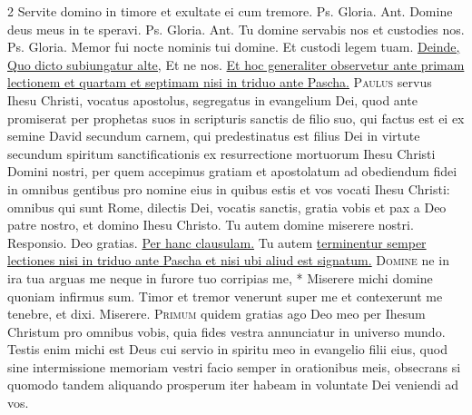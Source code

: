 \begin{multicols*}{2}
 Servite domino in timore et exultate ei cum tremore. {\color{Red} Ps.}     Gloria. {\color{Red} Ant.} Domine deus meus in te speravi. {\color{Red} Ps.}     Gloria. {\color{Red} Ant.} Tu domine servabis nos et custodies nos. {\color{Red} Ps.}     Gloria. \V Memor fui nocte nominis tui domine. \R Et custodi legem tuam. \ul{Deinde,}  \ul{Quo dicto subiungatur alte,} Et ne nos. \ul{Et hoc generaliter observetur ante primam lectionem et quartam et septimam nisi in triduo ante Pascha.}
\lettrine[lines=2]{\zallmancaps \color{Blue} P}{aulus} servus Ihesu Christi, vocatus apostolus, segregatus in evangelium Dei, quod ante promiserat per prophetas suos in scripturis sanctis de filio suo, qui factus est ei ex semine David secundum carnem, qui predestinatus est filius Dei in virtute secundum spiritum sanctificationis ex resurrectione mortuorum Ihesu Christi Domini nostri, per quem accepimus gratiam et apostolatum ad obediendum fidei in omnibus gentibus pro nomine eius in quibus estis et vos vocati Ihesu Christi: omnibus qui sunt Rome, dilectis Dei, vocatis sanctis, gratia vobis et pax a Deo patre nostro, et domino Ihesu Christo. Tu autem domine miserere nostri. {\color{Red} Responsio.} Deo gratias. \ul{Per hanc clausulam.} Tu autem \ul{terminentur semper lectiones nisi in triduo ante Pascha et nisi ubi aliud est signatum.}
\lettrine[lines=2]{\zallmancaps \color{Red} D}{omine} \hypertarget{domine-ne-in-ira}{\label{domine-ne-in-ira}} ne in ira tua arguas me neque in furore tuo corripias me, * Miserere michi domine quoniam infirmus sum. \V Timor et tremor venerunt super me et contexerunt me tenebre, et dixi. Miserere.
\lettrine[lines=2]{\zallmancaps \color{Blue} P}{rimum} quidem gratias ago Deo meo per Ihesum Christum pro omnibus vobis, quia fides vestra annunciatur in universo mundo. Testis enim michi est Deus cui servio in spiritu meo in evangelio filii eius, quod sine intermissione memoriam vestri facio semper in orationibus meis, obsecrans si quomodo tandem aliquando prosperum iter habeam in voluntate Dei veniendi ad vos.

\end{multicols*}
